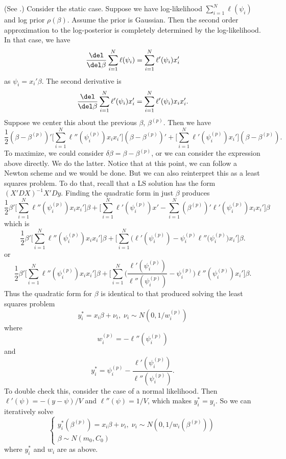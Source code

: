 \documentclass{article}
\begin{document}
(See \citep{wedderburn-1974}.)  Consider the static case.  Suppose we
have log-likelihood $\sum_{i=1}^N \ell(\psi_i)$ and log prior $\rho(\beta)$.
Assume the prior is Gaussian.  Then the second order approximation to the
log-posterior is completely determined by the log-likelihood.  In that case, we
have
\[
\frac{\del}{\del \beta} \sum_{i=1}^N \ell(\psi_i) = 
\sum_{i=1}^N \ell'(\psi_i) x_i'
\]
as $\psi_i = x_i' \beta$.  The second derivative is
\[
\frac{\del}{\del \beta} \sum_{i=1}^N \ell'(\psi_i) x_i'
= \sum_{i=1}^N \ell'(\psi_i) x_i x_i'.
\]
Suppose we center this about the previous $\beta$, $\beta^{(p)}$.  Then we have
\[
\frac{1}{2} (\beta - \beta^{(p)})' \Big[  \sum_{i=1}^N \ell''(\psi_i^{(p)}) x_i x_i'
\Big]  (\beta - \beta^{(p)})'  + \Big[ \sum_{i=1}^N \ell'(\psi_i^{(p)}) x_i' \Big]
(\beta - \beta^{(p)}).
\]
To maximize, we could consider $\delta \beta = \beta - \beta^{(p)}$, or we can
consider the expression above directly.  We do the latter.  Notice that at this
point, we can follow a Newton scheme and we would be done.  But we can also
reinterpret this as a least squares problem.  To do that, recall that a LS
solution has the form $(X'DX)^{-1} X'Dy$.  Finding the quadratic form in just
$\beta$ produces
\[
\frac{1}{2} \beta' \Big[  \sum_{i=1}^N \ell''(\psi_i^{(p)}) x_i x_i'
\Big] \beta + \Big[ \sum_{i=1}^N \ell'(\psi_i^{(p)}) x' - 
\sum_{i=1}^N (\beta^{(p)})' \ell'(\psi_i^{(p)}) x_i x_i' \Big] \beta
\]
which is
\[
\frac{1}{2} \beta' \Big[  \sum_{i=1}^N \ell''(\psi_i^{(p)}) x_i x_i'
\Big] \beta 
+ \Big[ \sum_{i=1}^N \Big(\ell'(\psi_i^{(p)}) - \psi_i^{(p)} \ell''(\psi_i^{(p)}\Big)
x_i' \Big] \beta.
\]
or
\[
\frac{1}{2} \beta' \Big[  \sum_{i=1}^N \ell''(\psi_i^{(p)}) x_i x_i'
\Big] \beta 
+ \Big[ \sum_{i=1}^N \Big(\frac{\ell'(\psi_i^{(p)})}{\ell''(\psi_i^{(p)})} - \psi_i^{(p)} \Big)
\ell''(\psi_i^{(p)}) x_i' \Big] \beta.
\]
Thus the quadratic form for $\beta$ is identical to that produced solving the
least squares problem
\[
y_i^* = x_i \beta + \nu_i, \; \nu_i \sim N(0,1/w_i^{(p)})
\]
where
\[
w^{(p)}_i = -\ell''(\psi_i^{(p)})
\]
and
\[
y_i^* = \psi_i^{(p)} - \frac{\ell'(\psi_i^{(p)})}{\ell''(\psi_i^{(p)})}.
\]
To double check this, consider the case of a normal likelihood.  Then
$\ell'(\psi) = -(y-\psi) / V$ and $\ell''(\psi) = 1/V$, which makes $y_i^* =
y_i$.  So we can iteratively solve
\[
\begin{cases}
y_i^*(\beta^{(p)}) = x_i \beta + \nu_i, \; \nu_i \sim N(0, 1/w_i(\beta^{(p)}))
\\
\beta \sim N(m_0, C_0)
\end{cases}
\]
where $y_i^*$ and $w_i$ are as above.
\end{document}
